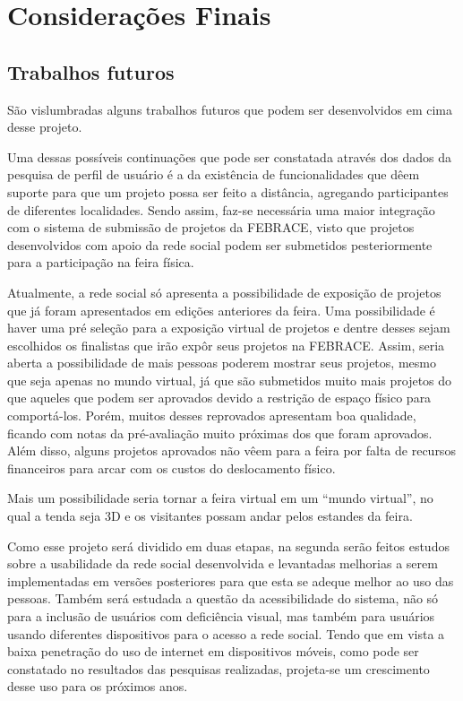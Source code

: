 
\chapter{Considerações Finais}

\section{Trabalhos futuros}

São vislumbradas alguns trabalhos futuros que podem ser desenvolvidos em cima desse projeto. 

Uma dessas possíveis continuações que pode ser constatada através dos dados da pesquisa de perfil de usuário é a da existência de funcionalidades que dêem suporte para que um projeto possa ser feito a distância, agregando participantes de diferentes localidades. Sendo assim, faz-se necessária uma maior integração com o sistema de submissão de projetos da FEBRACE, visto que projetos desenvolvidos com apoio da rede social podem ser submetidos pesteriormente para a participação na feira física. 

Atualmente, a rede social só apresenta a possibilidade de exposição de projetos que já foram apresentados em edições anteriores da feira. Uma possibilidade é haver uma pré seleção para a exposição virtual de projetos e dentre desses sejam escolhidos os finalistas que irão expôr seus projetos na FEBRACE. Assim, seria aberta a possibilidade de mais pessoas poderem mostrar seus projetos, mesmo que seja apenas no mundo virtual, já que são submetidos muito mais projetos do que aqueles que podem ser aprovados devido a restrição de espaço físico para comportá-los. Porém, muitos desses reprovados apresentam boa qualidade, ficando com notas da pré-avaliação muito próximas dos que foram aprovados. Além disso, alguns projetos aprovados não vêem para a feira por falta de recursos financeiros para arcar com os custos do deslocamento físico.

Mais um possibilidade seria tornar a feira virtual em um “mundo virtual”, no qual a tenda seja 3D e os visitantes possam andar pelos estandes da feira.

Como esse projeto será dividido em duas etapas, na segunda serão feitos estudos sobre a usabilidade da rede social desenvolvida e levantadas melhorias a serem implementadas em versões posteriores para que esta se adeque melhor ao uso das pessoas. Também será estudada a questão da acessibilidade do sistema, não só para a inclusão de usuários com deficiência visual, mas também para usuários usando diferentes dispositivos para o acesso a rede social. Tendo que em vista a baixa penetração do uso de internet em dispositivos móveis, como pode ser constatado no resultados das pesquisas realizadas, projeta-se um crescimento desse uso para os próximos anos.


